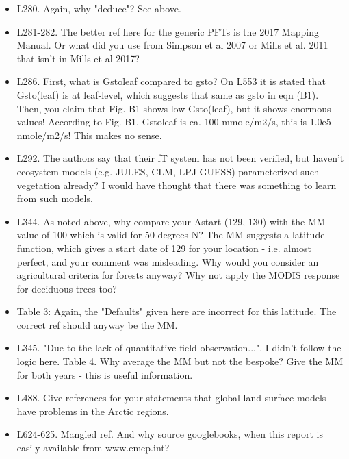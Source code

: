 \documentclass{scrartcl}
\begin{document}
\begin{itemize}
\item {\color{blue}L280. Again, why "deduce"?}
See above.

\item {\color{blue}L281-282. The better ref here for the generic PFTs is the 2017 Mapping Manual. Or what did you use from Simpson et al 2007 or Mills et al. 2011 that isn't in Mills et al 2017?}

\item {\color{blue}L286. First, what is Gstoleaf compared to gsto? On L553 it is stated that Gsto(leaf) is at leaf-level, which suggests that same as gsto in eqn (B1). Then, you claim that Fig. B1 shows low Gsto(leaf), but it shows enormous values! According to Fig. B1, Gstoleaf is ca. 100 mmole/m2/s, this is 1.0e5 nmole/m2/s! This makes no sense.}

\item {\color{blue}L292. The authors say that their fT system has not been verified, but haven't ecosystem models (e.g. JULES, CLM, LPJ-GUESS) parameterized such vegetation already? I would have thought that there was something to learn from such models.}

\item {\color{blue}L344. As noted above, why compare your Astart (129, 130) with the MM value of 100 which is valid for 50 degrees N? The MM suggests a latitude function, which gives a start date of 129 for your location - i.e. almost perfect, and your comment was misleading. Why would you consider an agricultural criteria for forests anyway? Why not apply the MODIS response for deciduous trees too?}

\item {\color{blue}Table 3: Again, the "Defaults" given here are incorrect for this latitude. The correct ref should anyway be the MM.}

\item {\color{blue}L345. "Due to the lack of quantitative field observation...". I didn't follow the logic here. Table 4. Why average the MM but not the bespoke? Give the MM for both years - this is useful information.}

\item {\color{blue}L488. Give references for your statements that global land-surface models have problems in the Arctic regions.}

\item {\color{blue}L624-625. Mangled ref. And why source googlebooks, when this report is easily available from www.emep.int?}


\end{itemize}
\end{document}
